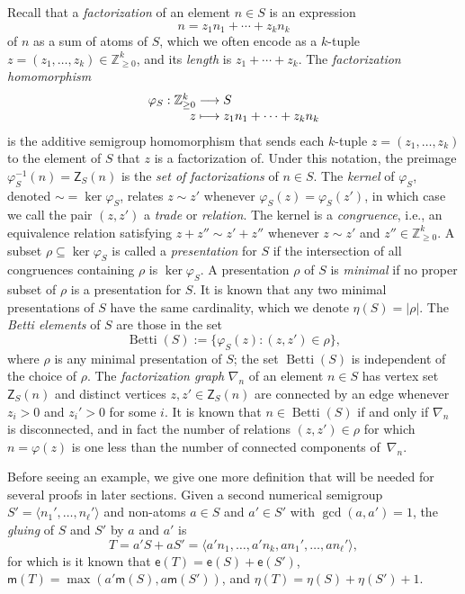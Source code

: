\documentclass[ALCO]{cedram}
\newcommand\ZZ{\mathbb{Z}}
\newcommand\til{\mathord\sim}
\DeclareMathOperator\Betti{Betti}
\begin{document}
Recall that a \emph{factorization} of an element $n \in S$ is an expression
$$n = z_1n_1 + \cdots + z_kn_k$$
of $n$ as a sum of atoms of $S$, which we often encode as a $k$-tuple $z = (z_1, \ldots, z_k) \in \ZZ_{\ge 0}^k$, and its \emph{length} is $z_1 + \cdots + z_k$.  
The \emph{factorization homomorphism}
$$\begin{array}{r@{}c@{}l}
\varphi_S:\ZZ_{\ge 0}^k &{}\longrightarrow{}& S \\
z &{}\longmapsto{}& z_1n_1 + \cdots + z_kn_k
\end{array}$$
is the additive semigroup homomorphism that sends each $k$-tuple $z = (z_1, \ldots, z_k)$ to the element of $S$ that $z$ is a factorization of.  Under this notation, the preimage $\varphi_S^{-1}(n) = \mathsf Z_S(n)$ is the \emph{set of factorizations} of $n \in S$.  
The \emph{kernel} of $\varphi_S$, denoted $\til = \ker\varphi_S$, relates $z \sim  z'$ whenever $\varphi_S(z) = \varphi_S(z')$, in which case we call the pair $(z,z')$ a \emph{trade} or \emph{relation}.  
The kernel is a \emph{congruence}, i.e., an equivalence relation satisfying $z + z'' \sim z' + z''$ whenever $z \sim z'$ and $z'' \in \ZZ_{\ge 0}^k$.  
A subset $\rho \subseteq \ker\varphi_S$ is called a \emph{presentation} for $S$ if the intersection of all congruences containing $\rho$ is $\ker\varphi_S$.  A presentation $\rho$ of $S$ is \emph{minimal} if no proper subset of $\rho$ is a presentation for $S$.  It is known that any two minimal presentations of $S$ have the same cardinality, which we denote $\eta(S) = |\rho|$.  
The \emph{Betti elements} of $S$ are those in the set
$$\Betti(S) := \{\varphi_S(z) : (z, z') \in \rho\},$$
where $\rho$ is any minimal presentation of $S$; the set $\Betti(S)$ is independent of the choice of $\rho$.  
The \emph{factorization graph} $\nabla_n$ of an element $n \in S$ has vertex set $\mathsf Z_S(n)$ and distinct vertices $z, z' \in \mathsf Z_S(n)$ are connected by an edge whenever $z_i > 0$ and $z_i' > 0$ for some $i$.  It is known that $n \in \Betti(S)$ if and only if $\nabla_n$ is disconnected, and in fact the number of relations $(z, z') \in \rho$ for which $n = \varphi(z)$ is one less than the number of connected components of~$\nabla_n$.  

Before seeing an example, we give one more definition that will be needed for several proofs in later sections.  
Given a second numerical semigroup $S' = \langle n_1', \dots, n_\ell' \rangle$ and non-atoms $a \in S$ and $a' \in S'$ with $\gcd(a,a') = 1$, the \emph{gluing} of $S$ and $S'$ by $a$ and $a'$ is
$$T = a'S + aS' = \langle a' n_1, \ldots, a' n_k, an_1', \ldots, an_\ell' \rangle,$$
for which is it known \cite{delormegluings,completeintersection} that $\mathsf e(T) = \mathsf e(S) + \mathsf e(S')$, $\mathsf m(T) = \max(a'\mathsf m(S), a\mathsf m(S'))$, and $\eta(T)=\eta(S)+\eta(S')+1$. 
\end{document}

